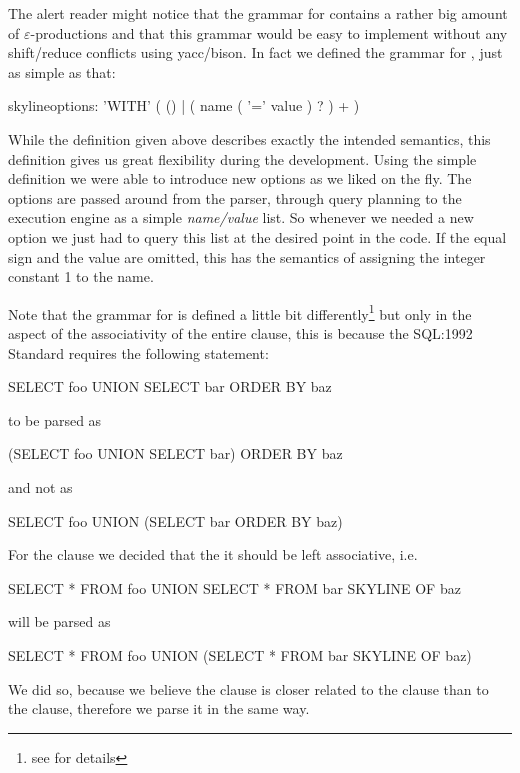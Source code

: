 The alert reader might notice that the grammar for 
contains a rather big amount of $\varepsilon$-productions and that this
grammar would be easy to implement without any shift/reduce conflicts
using yacc/bison. In fact we defined the grammar for
, just as simple as that:

\begin{rail}
skylineoptions:
    'WITH' ( () | ( name ( '=' value ) ? ) + )
\end{rail}

While the definition given above describes exactly the intended
semantics, this definition gives us great flexibility during the
development. Using the simple definition we were able to
introduce new options as we liked on the fly.  The options are passed
around from the parser, through query planning to the execution engine
as a simple \emph{name/value} list.  So whenever we needed a new
option we just had to query this list at the desired point in the
code. If the equal sign and the value are omitted, this has the
semantics of assigning the integer constant 1 to the name.

Note that the grammar for  is defined
a little bit differently\footnote{see 
for details} but only in the aspect of the associativity of the entire
 clause, this is because the SQL:1992 Standard
\citep{SQL92} requires the following statement:

\begin{sql}SELECT foo UNION SELECT bar ORDER BY baz\end{sql}
to be parsed as
\begin{sql}(SELECT foo UNION SELECT bar) ORDER BY baz\end{sql}
and not as
\begin{sql}SELECT foo UNION (SELECT bar ORDER BY baz)\end{sql}

\noindent{}For the  clause we decided that the it should be left
associative, i.e. 
\begin{sql}SELECT * FROM foo UNION SELECT * FROM bar SKYLINE OF baz\end{sql}
will be parsed as 
\begin{sql}SELECT * FROM foo UNION (SELECT * FROM bar SKYLINE OF baz)\end{sql}

\noindent{}We did so, because we believe the  clause is closer
related to the  clause than to the 
clause, therefore we parse it in the same way.

